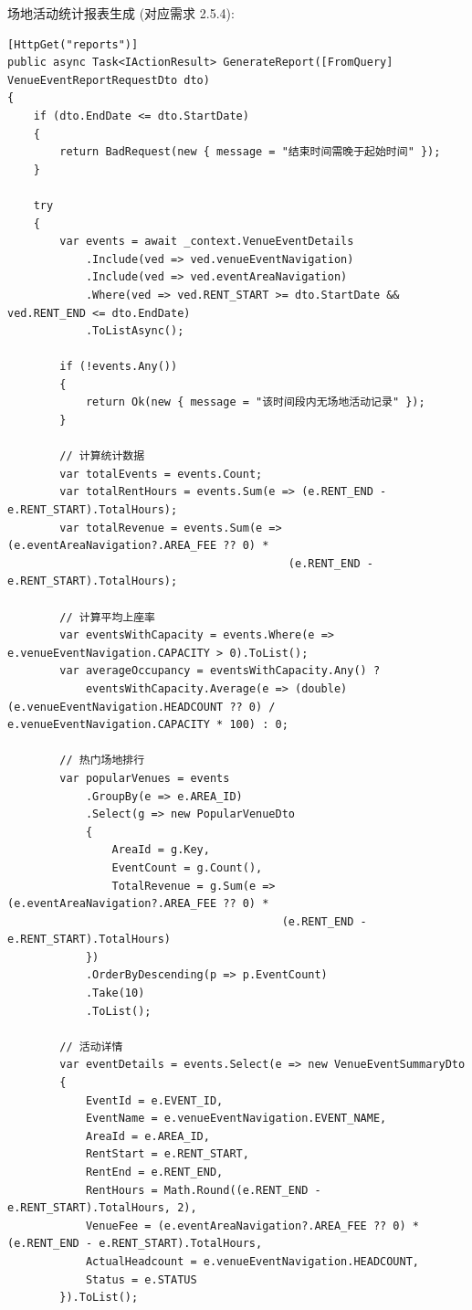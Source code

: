 \documentclass[]{article}
\begin{document}
场地活动统计报表生成 (对应需求 2.5.4):
\begin{verbatim}
[HttpGet("reports")]
public async Task<IActionResult> GenerateReport([FromQuery] VenueEventReportRequestDto dto)
{
    if (dto.EndDate <= dto.StartDate)
    {
        return BadRequest(new { message = "结束时间需晚于起始时间" });
    }

    try
    {
        var events = await _context.VenueEventDetails
            .Include(ved => ved.venueEventNavigation)
            .Include(ved => ved.eventAreaNavigation)
            .Where(ved => ved.RENT_START >= dto.StartDate && ved.RENT_END <= dto.EndDate)
            .ToListAsync();

        if (!events.Any())
        {
            return Ok(new { message = "该时间段内无场地活动记录" });
        }

        // 计算统计数据
        var totalEvents = events.Count;
        var totalRentHours = events.Sum(e => (e.RENT_END - e.RENT_START).TotalHours);
        var totalRevenue = events.Sum(e => (e.eventAreaNavigation?.AREA_FEE ?? 0) * 
                                           (e.RENT_END - e.RENT_START).TotalHours);

        // 计算平均上座率
        var eventsWithCapacity = events.Where(e => e.venueEventNavigation.CAPACITY > 0).ToList();
        var averageOccupancy = eventsWithCapacity.Any() ? 
            eventsWithCapacity.Average(e => (double)(e.venueEventNavigation.HEADCOUNT ?? 0) / e.venueEventNavigation.CAPACITY * 100) : 0;

        // 热门场地排行
        var popularVenues = events
            .GroupBy(e => e.AREA_ID)
            .Select(g => new PopularVenueDto
            {
                AreaId = g.Key,
                EventCount = g.Count(),
                TotalRevenue = g.Sum(e => (e.eventAreaNavigation?.AREA_FEE ?? 0) * 
                                          (e.RENT_END - e.RENT_START).TotalHours)
            })
            .OrderByDescending(p => p.EventCount)
            .Take(10)
            .ToList();

        // 活动详情
        var eventDetails = events.Select(e => new VenueEventSummaryDto
        {
            EventId = e.EVENT_ID,
            EventName = e.venueEventNavigation.EVENT_NAME,
            AreaId = e.AREA_ID,
            RentStart = e.RENT_START,
            RentEnd = e.RENT_END,
            RentHours = Math.Round((e.RENT_END - e.RENT_START).TotalHours, 2),
            VenueFee = (e.eventAreaNavigation?.AREA_FEE ?? 0) * (e.RENT_END - e.RENT_START).TotalHours,
            ActualHeadcount = e.venueEventNavigation.HEADCOUNT,
            Status = e.STATUS
        }).ToList();


\end{verbatim}
\end{document}
